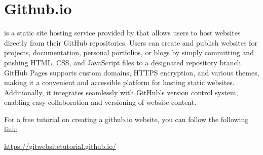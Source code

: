 \section{Github.io}

 is a static site hosting service provided by  that allows users to host websites directly from their GitHub repositories. Users can create and publish websites for projects, documentation, personal portfolios, or blogs by simply committing and pushing HTML, CSS, and JavaScript files to a designated repository branch. GitHub Pages supports custom domains, HTTPS encryption, and various themes, making it a convenient and accessible platform for hosting static websites. Additionally, it integrates seamlessly with GitHub's version control system, enabling easy collaboration and versioning of website content.

\begin{urlbox}
For a free tutorial on creating a github.io website, you can follow the following link:

\url{https://gitwebsitetutorial.github.io/}
\end{urlbox}